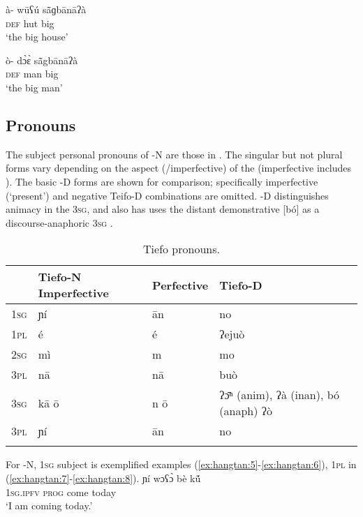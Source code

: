 \documentclass[output=paper,
modfonts
]{langscibook}
\begin{document}
\ea\label{ex:hangtan:3}
\gll à-           wūʕú s{\={ã}}ɡbānāʔà\\
     \textsc{def} hut big\\
\glt ‘the big house’
\z

\ea\label{ex:hangtan:4}
\gll ò-           d\`{ɔ}\`{ɛ} s{\={ã}}gbānāʔà\\
     \textsc{def} man          big\\
\glt ‘the big man’
\z

\subsection{Pronouns}\label{sec:hangtan:3.4}

The subject personal pronouns of -N are those in . The singular but not plural forms vary depending on the aspect (/imperfective) of the  (imperfective includes ). The basic -D forms \citep[140]{Winkelmann1998} are shown for comparison; specifically imperfective (‘present’) and negative Teifo-D combinations are omitted. -D distinguishes animacy in the \textsc{3sg}, and also has uses the distant demonstrative [bó] as a discourse-anaphoric \textsc{3sg} .

\begin{table}
\caption{Tiefo pronouns.}
\label{tab:hangtan:5}
\begin{tabularx}{\textwidth}{lllQ} 
\lsptoprule
& {\bfseries  {Tiefo}-N Imperfective} & {\bfseries Perfective} & {\bfseries  {Tiefo}-D}\\
\midrule
{\textsc{1sg}} & { ɲí} & { ān} & { no}\\
{\textsc{1pl}} & { é} & { é} & { ʔejuò}\\
{\textsc{2sg}} & { mì} & { m} & { mo}\\
{\textsc{3pl}} & { nā} & { nā} & { buò}\\
{\textsc{3sg}} & { kā \=o} & { n \=o} & { {ʔ}\={ɔ}{ⁿ} {(anim),} {ʔà} {(inan),} {bó} {(anaph)} ʔò}\\
{\textsc{3pl}} & { ɲí} & { ān} & { no}\\
\lspbottomrule
\end{tabularx}
\end{table}

For -N, \textsc{1sg} subject is exemplified examples (\ref{ex:hangtan:5}-\ref{ex:hangtan:6}), \textsc{1pl} in (\ref{ex:hangtan:7}-\ref{ex:hangtan:8}).
\ea\label{ex:hangtan:5}
\gll ɲí wɔʕ\`{ɔ} bè kṹ\\
     \textsc{1sg}.\textsc{ipfv} \textsc{prog} come today\\
\glt ‘I am coming today.’
\z
\end{document}
